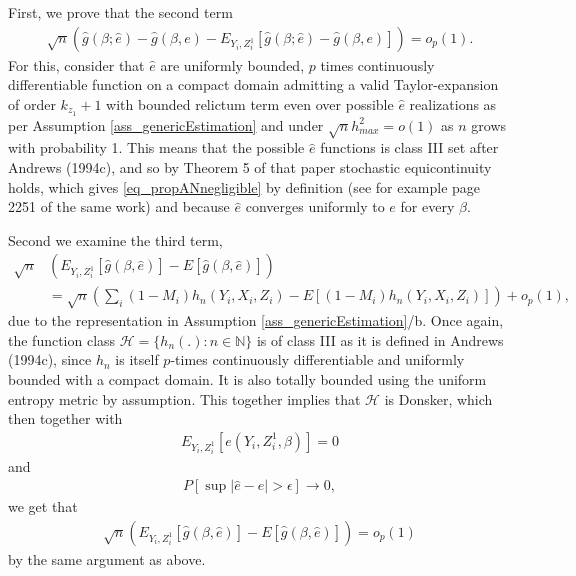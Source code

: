 \documentclass{article}
\theoremstyle{definition}
\theoremstyle{remark}
\begin{document}
First, we prove that the second term
\begin{align}
\sqrt{n}(\hat{g}(\beta; \hat{e}) - \hat{g}(\beta,e)- E_{Y_i,Z^1_i}[\hat{g}(\beta; \hat{e})-\hat{g}(\beta,e)]) = o_p(1).\label{eq_propANnegligible}
\end{align}
For this, consider that $\hat{e}$ are uniformly bounded, $p$ times continuously differentiable function on a compact domain admitting a valid Taylor-expansion of order $k_{z_1}+1$ with bounded relictum term even over possible $\hat{e}$ realizations as per Assumption \ref{ass_genericEstimation} and under $\sqrt{n}h_{max}^2=o(1)$ as $n$ grows with probability 1. This means that the possible $\hat{e}$ functions is class III set after Andrews (1994c), and so by Theorem 5 of that paper stochastic equicontinuity holds, which gives \eqref{eq_propANnegligible} by definition (see for example page 2251 of the same work) and because $\hat{e}$ converges uniformly to $e$ for every $\beta$.

Second we examine the third term,
\begin{align}
\sqrt{n}&\left(E_{Y_i,Z_i^1}[\hat{g}(\beta,\hat{e})]-E[\hat{g}(\beta,\hat{e})]\right) \\
&=\sqrt{n}\left( \sum_i (1-M_i)h_n(Y_i, X_i, Z_i)
-E[(1-M_i) h_n(Y_i, X_i, Z_i)]\right) + o_p(1), \nonumber
\end{align}
due to the representation in Assumption \ref{ass_genericEstimation}/b. Once again, the function class $\mathcal{H} = \{h_n(.): n \in \mathbb{N}\}$ is of class III as it is defined in Andrews (1994c), since $h_n$ is itself $p$-times continuously differentiable and uniformly bounded with a compact domain. It is also totally bounded using the uniform entropy metric by assumption. {\color{red}This together implies that $\mathcal{H}$ is Donsker, which then together with
\begin{align}
E_{Y_i,Z_i^1}[e(Y_i, Z_i^1,\beta)]=0 
\end{align}
and
\begin{align}
P[\sup|\hat{e}-e|>\epsilon ] \rightarrow 0,
\end{align}
we get that
\begin{align}
\sqrt{n}\left(E_{Y_i,Z_i^1}[\hat{g}(\beta,\hat{e})]-E[\hat{g}(\beta,\hat{e})]\right) = o_p(1)
\end{align}
by the same argument as above.}
\end{document}
